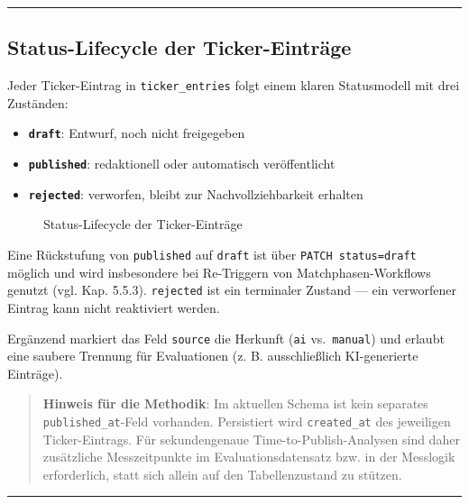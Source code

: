 \begin{center}\rule{0.5\linewidth}{0.5pt}\end{center}

\subsection{Status-Lifecycle der
Ticker-Einträge}\label{status-lifecycle-der-ticker-eintruxe4ge}

Jeder Ticker-Eintrag in \texttt{ticker\_entries} folgt einem klaren
Statusmodell mit drei Zuständen:

\begin{itemize}
\tightlist
\item
  \textbf{\texttt{draft}}: Entwurf, noch nicht freigegeben
\item
  \textbf{\texttt{published}}: redaktionell oder automatisch
  veröffentlicht
\item
  \textbf{\texttt{rejected}}: verworfen, bleibt zur Nachvollziehbarkeit
  erhalten
\end{itemize}

\begin{figure}[H]
\centering
\DiagramTickerStates
\caption{Status-Lifecycle der Ticker-Einträge}
\label{fig:tickerstates}
\end{figure}

Eine Rückstufung von \texttt{published} auf \texttt{draft} ist über
\texttt{PATCH\ status=draft} möglich und wird insbesondere bei
Re-Triggern von Matchphasen-Workflows genutzt (vgl. Kap. 5.5.3).
\texttt{rejected} ist ein terminaler Zustand --- ein verworfener Eintrag
kann nicht reaktiviert werden.

Ergänzend markiert das Feld \texttt{source} die Herkunft (\texttt{ai}
vs.~\texttt{manual}) und erlaubt eine saubere Trennung für Evaluationen
(z. B. ausschließlich KI-generierte Einträge).

\begin{quote}
\textbf{Hinweis für die Methodik}: Im aktuellen Schema ist kein
separates \texttt{published\_at}-Feld vorhanden. Persistiert wird
\texttt{created\_at} des jeweiligen Ticker-Eintrags. Für sekundengenaue
Time-to-Publish-Analysen sind daher zusätzliche Messzeitpunkte im
Evaluationsdatensatz bzw. in der Messlogik erforderlich, statt sich
allein auf den Tabellenzustand zu stützen.
\end{quote}

\begin{center}\rule{0.5\linewidth}{0.5pt}\end{center}

